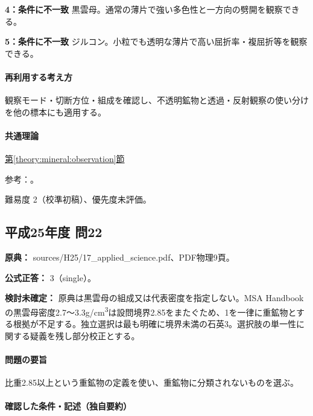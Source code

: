 \noindent\textbf{4：条件に不一致} 黒雲母。通常の薄片で強い多色性と一方向の劈開を観察できる。\par

\noindent\textbf{5：条件に不一致} ジルコン。小粒でも透明な薄片で高い屈折率・複屈折等を観察できる。\par

\paragraph{再利用する考え方} 観察モード・切断方位・組成を確認し、不透明鉱物と透過・反射観察の使い分けを他の標本にも適用する。

\paragraph{共通理論} \hyperref[theory:mineral:observation]{第\ref*{theory:mineral:observation}節}

\par 参考：\cite{hom_pyrite}。

\par 難易度 2（校準初稿）、優先度未評価。

\subsection{平成25年度 問22}
\label{q:h25-reg-applied-22}

\noindent\textbf{原典：} sources/H25/17\_applied\_science.pdf、PDF物理9頁。

\textbf{公式正答：} 3（single）。

\par\textbf{検討未確定：} 原典は黒雲母の組成又は代表密度を指定しない。MSA Handbookの黒雲母密度2.7〜3.3g/cm\textsuperscript{3}は設問境界2.85をまたぐため、1を一律に重鉱物とする根拠が不足する。独立選択は最も明確に境界未満の石英3。選択肢の単一性に関する疑義を残し部分校正とする。

\paragraph{問題の要旨} 比重2.85以上という重鉱物の定義を使い、重鉱物に分類されないものを選ぶ。

\paragraph{確認した条件・記述（独自要約）}\mbox{}\par

